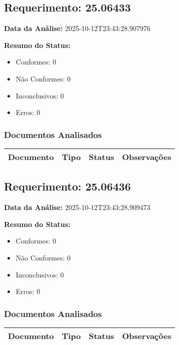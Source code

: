\documentclass[12pt,a4paper]{article}
\begin{document}
\subsection{Requerimento: 25.06433}

\textbf{Data da Análise:} 2025-10-12T23:43:28.907976

\textbf{Resumo do Status:}
\begin{itemize}
    \item Conformes: 0
    \item Não Conformes: 0
    \item Inconclusivos: 0
    \item Erros: 0
\end{itemize}

\subsubsection{Documentos Analisados}

\begin{longtable}{|p{4cm}|p{2cm}|p{2cm}|p{6cm}|}
\hline
\textbf{Documento} & \textbf{Tipo} & \textbf{Status} & \textbf{Observações} \\
\hline
\endhead
\end{longtable}


\subsection{Requerimento: 25.06436}

\textbf{Data da Análise:} 2025-10-12T23:43:28.909473

\textbf{Resumo do Status:}
\begin{itemize}
    \item Conformes: 0
    \item Não Conformes: 0
    \item Inconclusivos: 0
    \item Erros: 0
\end{itemize}

\subsubsection{Documentos Analisados}

\begin{longtable}{|p{4cm}|p{2cm}|p{2cm}|p{6cm}|}
\hline
\textbf{Documento} & \textbf{Tipo} & \textbf{Status} & \textbf{Observações} \\
\hline
\endhead
\end{longtable}
\end{document}
